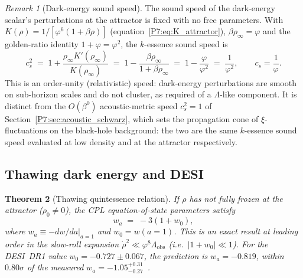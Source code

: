 \documentclass[11pt,a4paper]{article}
\newtheorem{theorem}{Theorem}[section]
\theoremstyle{definition}
\theoremstyle{remark}
\newtheorem{remark}[theorem]{Remark}
\newcommand{\vp}{\varphi}
\newcommand{\Lobs}{\Lambda_{\mathrm{obs}}}
\newcommand{\rinfty}{\rho_{\infty}}
\begin{document}
\begin{remark}[Dark-energy sound speed]
\label{P7:rem:cs_de}
The sound speed of the dark-energy scalar's perturbations at the attractor
is fixed with no free parameters.  With $K(\rho)=1/[\vp^6(1+\beta\rho)]$
(equation~\eqref{P7:eq:K_attractor}), $\beta\rinfty=\vp$ and the golden-ratio
identity $1+\vp=\vp^2$, the $k$-essence sound speed is
\begin{equation}
  c_s^2 \;=\; 1 + \frac{\rinfty K'(\rinfty)}{K(\rinfty)}
        \;=\; 1 - \frac{\beta\rinfty}{1+\beta\rinfty}
        \;=\; 1 - \frac{\vp}{\vp^2}
        \;=\; \frac{1}{\vp^2},
        \qquad \boxed{c_s=\frac{1}{\vp}}.
  \label{P7:eq:cs_de}
\end{equation}
This is an order-unity (relativistic) speed: dark-energy perturbations are
smooth on sub-horizon scales and do not cluster, as required of a
$\Lambda$-like component.  It is distinct from the $O(\beta^0)$ acoustic-metric
speed $c_s^2=1$ of Section~\ref{P7:sec:acoustic_schwarz}, which sets the
propagation cone of $\xi$-fluctuations on the black-hole background: the two
are the same $k$-essence sound speed evaluated at low density and at the
attractor respectively.
\end{remark}

\subsection{Thawing dark energy and DESI}

\begin{theorem}[Thawing quintessence relation]
\label{P7:thm:thawing}
If $\rho$ has not fully frozen at the attractor ($\dot\rho_0\neq0$),
the CPL equation-of-state parameters satisfy
\begin{equation}
  \boxed{w_a \;=\; -3(1+w_0),}
  \label{P7:eq:thawing}
\end{equation}
where $w_a\equiv-dw/da\big|_{a=1}$ and $w_0=w(a=1)$.
This is an exact result at leading order in the slow-roll expansion
$\dot\rho^2\ll\vp^8\Lobs$ (i.e.\ $|1+w_0|\ll1$).
For the DESI~DR1 value $w_0=-0.727\pm0.067$, the prediction is
$w_a=-0.819$, within $0.80\sigma$ of the measured
$w_a=-1.05^{+0.31}_{-0.27}$~\cite{DESI2024}.
\end{theorem}
\end{document}
